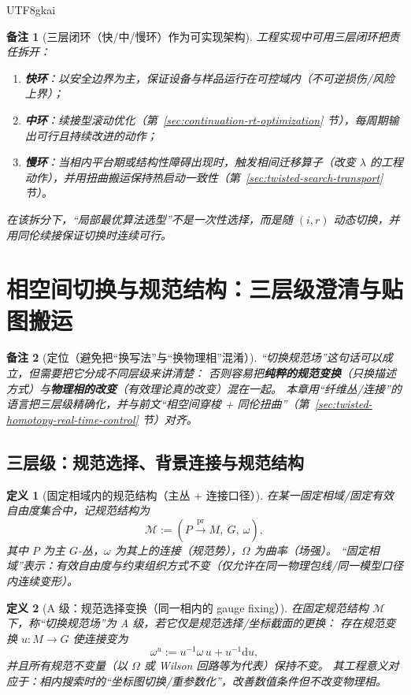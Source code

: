 \documentclass[12pt]{article}
\newtheorem{definition}{定义}[section]
\newtheorem{remark}{备注}[section]
\newcommand{\Base}{\ensuremath{M}}
\newcommand{\Bundle}{\ensuremath{P}}
\newcommand{\pr}{\operatorname{pr}}
\newcommand{\Group}{\ensuremath{G}}
\newcommand{\Conn}{\ensuremath{\omega}}
\newcommand{\Curv}{\ensuremath{\Omega}}
\begin{document}
\begin{CJK*}{UTF8}{gkai}
\begin{remark}[三层闭环（快/中/慢环）作为可实现架构]
工程实现中可用三层闭环把责任拆开：
\begin{enumerate}
  \item \textbf{快环}：以安全边界为主，保证设备与样品运行在可控域内（不可逆损伤/风险上界）；
  \item \textbf{中环}：续接型滚动优化（第~\ref{sec:continuation-rt-optimization} 节），每周期输出可行且持续改进的动作；
  \item \textbf{慢环}：当相内平台期或结构性障碍出现时，触发相间迁移算子（改变 $\lambda$ 的工程动作），并用扭曲搬运保持热启动一致性（第~\ref{sec:twisted-search-transport} 节）。
\end{enumerate}
在该拆分下，“局部最优算法选型”不是一次性选择，而是随 $(i,r)$ 动态切换，并用同伦续接保证切换时连续可行。
\end{remark}

\section{相空间切换与规范结构：三层级澄清与贴图搬运}
\label{sec:gauge-structure-switching}

\begin{remark}[定位（避免把“换写法”与“换物理相”混淆）]
“切换规范场”这句话可以成立，但需要把它分成不同层级来讲清楚：
否则容易把\textbf{纯粹的规范变换}（只换描述方式）与\textbf{物理相的改变}（有效理论真的改变）混在一起。
本章用“纤维丛/连接”的语言把三层级精确化，并与前文“相空间穿梭 + 同伦扭曲”（第~\ref{sec:twisted-homotopy-real-time-control} 节）对齐。
\end{remark}

\subsection{三层级：规范选择、背景连接与规范结构}
\label{sec:gauge-switching-three-levels}

\begin{definition}[固定相域内的规范结构（主丛 + 连接口径）]
在某一固定相域/固定有效自由度集合中，记规范结构为
\[
  \mathcal{M}:=(\Bundle\xrightarrow{\pr}\Base,\ \Group,\ \Conn),
\]
其中 $\Bundle$ 为主 $\Group$-丛，$\Conn$ 为其上的连接（规范势），$\Curv$ 为曲率（场强）。
“固定相域”表示：有效自由度与约束组织方式不变（仅允许在同一物理包线/同一模型口径内连续变形）。
\end{definition}

\begin{definition}[A 级：规范选择变换（同一相内的 gauge fixing）]
在固定规范结构 $\mathcal{M}$ 下，称“切换规范场”为 A 级，若它仅是规范选择/坐标截面的更换：
存在规范变换 $u:\Base\to \Group$ 使连接变为
\[
  \Conn^{u}:=u^{-1}\Conn\,u + u^{-1}\mathrm{d}u,
\]
并且所有规范不变量（以 $\Curv$ 或 Wilson 回路等为代表）保持不变。
其工程意义对应于：相内搜索时的“坐标图切换/重参数化”，改善数值条件但不改变物理相。
\end{definition}


\end{CJK*}
\end{document}
